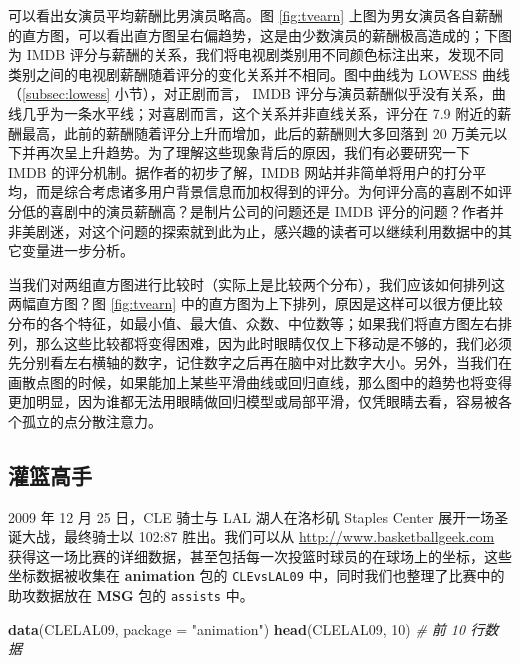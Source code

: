 \documentclass[
  b5paper,
  UTF8,twoside]{book}
\newenvironment{Shaded}{\begin{snugshade}}{\end{snugshade}}
\newcommand{\AttributeTok}[1]{\textcolor[rgb]{0.13,0.29,0.53}{#1}}
\newcommand{\CommentTok}[1]{\textcolor[rgb]{0.56,0.35,0.01}{\textit{#1}}}
\newcommand{\DecValTok}[1]{\textcolor[rgb]{0.00,0.00,0.81}{#1}}
\newcommand{\FunctionTok}[1]{\textcolor[rgb]{0.13,0.29,0.53}{\textbf{#1}}}
\newcommand{\NormalTok}[1]{#1}
\newcommand{\StringTok}[1]{\textcolor[rgb]{0.31,0.60,0.02}{#1}}
\begin{document}
可以看出女演员平均薪酬比男演员略高。图 \ref{fig:tvearn} 上图为男女演员各自薪酬的直方图，可以看出直方图呈右偏趋势，这是由少数演员的薪酬极高造成的；下图为 IMDB 评分与薪酬的关系，我们将电视剧类别用不同颜色标注出来，发现不同类别之间的电视剧薪酬随着评分的变化关系并不相同。图中曲线为 LOWESS 曲线（\ref{subsec:lowess} 小节），对正剧而言， IMDB 评分与演员薪酬似乎没有关系，曲线几乎为一条水平线；对喜剧而言，这个关系并非直线关系，评分在 7.9 附近的薪酬最高，此前的薪酬随着评分上升而增加，此后的薪酬则大多回落到 20 万美元以下并再次呈上升趋势。为了理解这些现象背后的原因，我们有必要研究一下 IMDB 的评分机制。据作者的初步了解，IMDB 网站并非简单将用户的打分平均，而是综合考虑诸多用户背景信息而加权得到的评分。为何评分高的喜剧不如评分低的喜剧中的演员薪酬高？是制片公司的问题还是 IMDB 评分的问题？作者并非美剧迷，对这个问题的探索就到此为止，感兴趣的读者可以继续利用数据中的其它变量进一步分析。

当我们对两组直方图进行比较时（实际上是比较两个分布），我们应该如何排列这两幅直方图？图 \ref{fig:tvearn} 中的直方图为上下排列，原因是这样可以很方便比较分布的各个特征，如最小值、最大值、众数、中位数等；如果我们将直方图左右排列，那么这些比较都将变得困难，因为此时眼睛仅仅上下移动是不够的，我们必须先分别看左右横轴的数字，记住数字之后再在脑中对比数字大小。另外，当我们在画散点图的时候，如果能加上某些平滑曲线或回归直线，那么图中的趋势也将变得更加明显，因为谁都无法用眼睛做回归模型或局部平滑，仅凭眼睛去看，容易被各个孤立的点分散注意力。

\subsection{灌篮高手}\label{ux704cux7beeux9ad8ux624b}

2009 年 12 月 25 日，CLE 骑士与 LAL 湖人在洛杉矶 Staples Center 展开一场圣诞大战，最终骑士以 102:87 胜出。我们可以从 \url{http://www.basketballgeek.com} 获得这一场比赛的详细数据，甚至包括每一次投篮时球员的在球场上的坐标，这些坐标数据被收集在 \textbf{animation} 包的 \texttt{CLEvsLAL09} 中，同时我们也整理了比赛中的助攻数据放在 \textbf{MSG} 包的 \texttt{assists} 中。

\begin{Shaded}
\begin{Highlighting}[]
\FunctionTok{data}\NormalTok{(CLELAL09, }\AttributeTok{package =} \StringTok{"animation"}\NormalTok{)}
\FunctionTok{head}\NormalTok{(CLELAL09, }\DecValTok{10}\NormalTok{) }\CommentTok{\# 前 10 行数据}
\end{Highlighting}
\end{Shaded}
\end{document}
